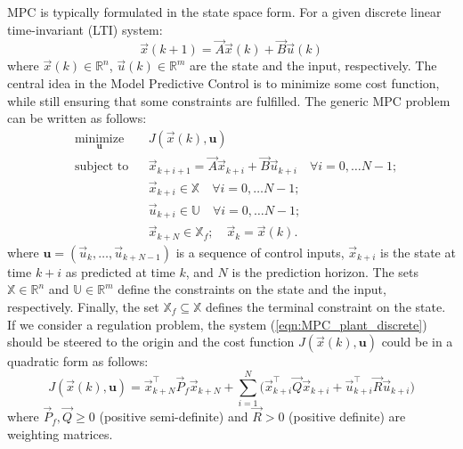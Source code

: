 MPC is typically formulated in the state space form. For a given discrete linear time-invariant (LTI) system:
\begin{equation}
\label{eqn:MPC_plant_discrete}
\vec{x}(k+1)=\vec{A}\vec{x}(k)+ \vec{B} \vec{u}(k)
\end{equation}
where $\vec{x}(k)\in\mathbb{R}^n$, $\vec{u}(k)\in\mathbb{R}^m$ are the state and the input, respectively. The central idea in the Model Predictive Control is to minimize some cost function, while still ensuring that some constraints are fulfilled. The generic MPC problem can be written as follows:
\begin{equation}
\label{eqn:MPC_optimization}
\begin{aligned}
& \underset{\textbf{u}}{\text{minimize}}
& & J(\vec{x}(k), \textbf{u}) \\
& \text{subject to}
& & \vec{x}_{k+i+1} = \vec{A}\vec{x}_{k+i}+ \vec{B} \vec{u}_{k+i}\quad\forall i=0,\dots N-1;\\
& & & \vec{x}_{k+i}\in \mathbb{X}\quad\forall i=0,\dots N-1;\\
& & & \vec{u}_{k+i}\in \mathbb{U}\quad\forall i=0,\dots N-1;\\  
& & & \vec{x}_{k+N}\in \mathbb{X}_f;\quad\vec{x}_k = \vec{x}(k).
\end{aligned}
\end{equation}
where $\textbf{u}=(\vec{u}_k,\dots,\vec{u}_{k+N-1})$ is a sequence of control inputs, $\vec{x}_{k+i}$ is the state at time $k+i$ as predicted at time $k$, and $N$ is the prediction horizon. The sets $\mathbb{X}\in\mathbb{R}^n$ and $\mathbb{U}\in\mathbb{R}^m$ define the constraints on the state and the input, respectively. Finally, the set $\mathbb{X}_f\subseteq\mathbb{X}$ defines the terminal constraint on the state. If we consider a regulation problem, the system (\ref{eqn:MPC_plant_discrete}) should be steered to the origin and the cost function $J(\vec{x}(k), \textbf{u})$ could be in a quadratic form as follows:
\begin{equation}
\label{eqn:MPC_cost_function_regulation}
	J(\vec{x}(k), \textbf{u}) = \vec{x}^\intercal_{k+N}\vec{P}_f\vec{x}_{k+N}+\sum_{i=1}^{N}\Big(\vec{x}^\intercal_{k+i}\vec{Q}\vec{x}_{k+i}+\vec{u}_{k+i}^\intercal\vec{R}\vec{u}_{k+i}\Big)
\end{equation}
where $\vec{P}_f,\vec{Q}\geq0$ (positive semi-definite) and $\vec{R}>0$ (positive definite) are weighting matrices.


